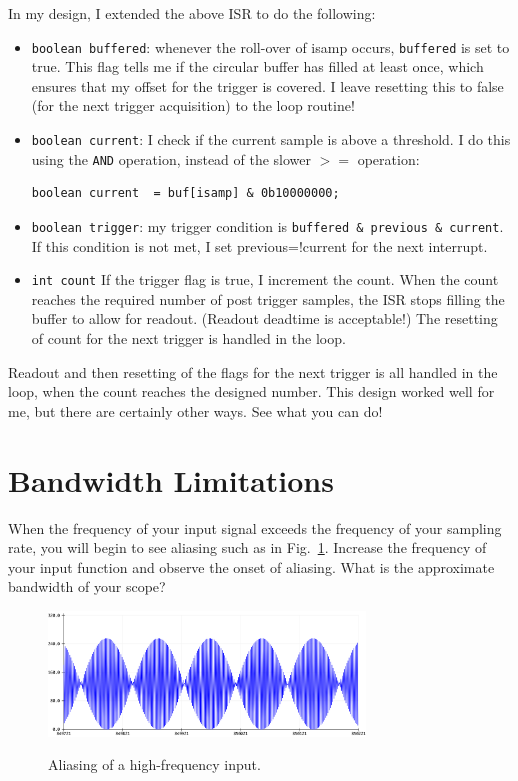 \documentclass[12pt]{article}
\begin{document}
In my design, I extended the above ISR to do the following:
\begin{itemize}
\item {\tt boolean buffered}:  whenever the roll-over of isamp occurs, {\tt buffered} is set to true.   This flag tells me if the circular buffer has filled at least once, which ensures that my offset for the trigger is covered.
I leave resetting this to false (for the next trigger acquisition) to the loop routine!
\item {\tt boolean current}:  I check if the current sample is above a threshold.  I do this using the {\tt AND} operation, instead of the slower $>=$ operation:
\begin{verbatim}
boolean current  = buf[isamp] & 0b10000000;
\end{verbatim} 
\item {\tt boolean trigger}: my trigger condition is  {\tt buffered \& previous \& current}.  If this condition is not met, I set previous=!current for the next interrupt.
\item {\tt int count} If the trigger flag is true, I increment the count.  When the count reaches the required number of post trigger samples, the ISR stops filling the buffer to allow for readout.  (Readout deadtime is acceptable!)  The resetting of count for the next trigger is handled in the loop.
\end{itemize} 
Readout and then resetting of the flags for the next trigger is all handled in the loop, when the count reaches the designed number.  This design worked well for me, but there are certainly other ways.  See what you can do!

\section{Bandwidth Limitations}

When the frequency of your input signal exceeds the frequency of your sampling rate, you will begin to see aliasing such as in Fig.~\ref{fig:aliasing}.  Increase the frequency of your input function and observe the onset of aliasing.  What is the approximate bandwidth of your scope? 
\begin{figure}[htbp]
\begin{center}
{\includegraphics[width=0.75\textwidth]{figs/aliasing.png}}
\end{center}
\caption{\label{fig:aliasing} Aliasing of a high-frequency input.}
\end{figure}
\end{document}

